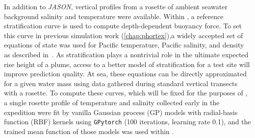 In addition to \emph{JASON}, vertical profiles from a rosette of ambient seawater background salinity and temperature were available. Within \PHUMES, a reference stratification curve is used to compute depth-dependent buoyancy force. To set this curve in previous simulation work (\cref{chap:phortex}),a widely accepted set of equations of state was used for Pacific temperature, Pacific salinity, and density as described in~\cite{speer1989model}. As stratification plays a nontrivial role in the ultimate expected rise height of a plume, access to a better model of stratification for a test site will improve prediction quality. At sea, these equations can be directly approximated for a given water mass using data gathered during standard vertical transects with a rosette. To compute these curves, which will be fixed for the purposes of \PHUMES, a single rosette profile of temperature and salinity collected early in the expedition were fit by vanilla Gaussian process (GP) models with radial-basis function (RBF) kernels using \verb|GPytorch| \autocite{gardner2018gpytorch} (100 iterations, learning rate 0.1), and the trained mean function of those models was used within \PHUMES.

